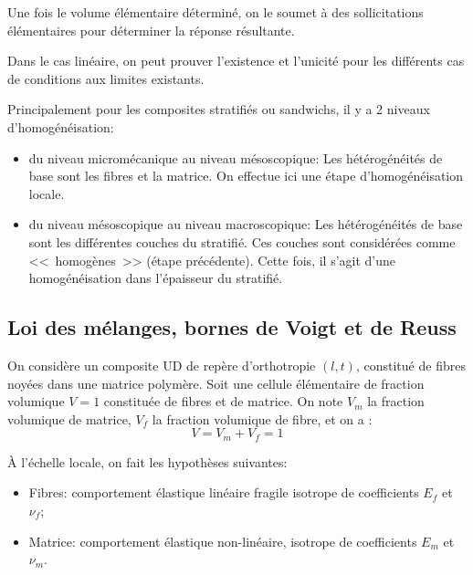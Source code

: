 \medskip
Une fois le volume élémentaire déterminé, on le soumet à des sollicitations élémentaires
pour déterminer la réponse résultante. 

\medskip
Dans le cas linéaire, on peut prouver l'existence et l'unicité pour les différents cas de
conditions aux limites existants.

\medskip
Principalement pour les composites stratifiés ou sandwichs, il y a 2 niveaux d'homogénéisation:
\begin{itemize}
	\item du niveau micromécanique au niveau mésoscopique:
		Les hétérogénéités de base sont les fibres et la matrice. On effectue ici
		 une étape d'homogénéisation locale.
	\item du niveau mésoscopique au niveau macroscopique:
		Les hétérogénéités de base sont les différentes couches du stratifié.
		 Ces couches sont considérées comme <<~homogènes~>> (étape précédente).
		 Cette fois, il s'agit d'une homogénéisation dans l'épaisseur du stratifié.
\end{itemize}



\medskip
\subsection{Loi des mélanges, bornes de Voigt et de Reuss}

On considère un composite UD de repère d'orthotropie $(l,t)$, constitué de fibres noyées dans
une matrice polymère. Soit une cellule élémentaire de fraction volumique $V = 1$ constituée de
fibres et de matrice. On note
$V_m$ la fraction volumique de matrice,
$V_f$ la fraction volumique de fibre, et on a :
\begin{equation} V = V_m + V_f =1 \end{equation}

\medskip
À l'échelle locale, on fait les hypothèses suivantes:
\begin{itemize}
   \item Fibres: comportement élastique linéaire fragile isotrope de coefficients $E_f$ et $\nu_f$;
   \item Matrice: comportement élastique non-linéaire, isotrope de coefficients $E_m$ et $\nu_m$.
\end{itemize}

